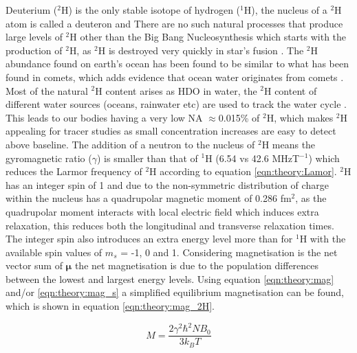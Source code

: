 Deuterium ($^2$H) is the only stable isotope of hydrogen ($^1$H), the nucleus of a $^2$H atom is called a deuteron and There are no such natural processes that produce large levels of $^2$H other than the Big Bang Nucleosynthesis which starts with the production of $^2$H, as $^2$H is destroyed very quickly in star's fusion \cite{Patrignani2016ReviewPhysics}. The $^2$H abundance found on earth's ocean has been found to be similar to what has been found in comets, which adds evidence that ocean water originates from comets \cite{Hersant2001APlanets}. Most of the natural $^2$H content arises as \ac{HDO} in water, the $^2$H content of different water sources (oceans, rainwater etc) are used to track the water cycle \cite{Bowen2019IsotopesApplications}. This leads to our bodies having a very low \ac{NA} $\approx$0.015\% of $^2$H, which makes $^2$H appealing for tracer studies as small concentration increases are easy to detect above baseline. The addition of a neutron to the nucleus of $^2$H means the gyromagnetic ratio ($\gamma$) is smaller than that of $^1$H (6.54 vs 42.6 MHzT$^{-1}$) which reduces the Larmor frequency of $^2$H according to equation \ref{eqn:theory:Lamor}. $^2$H has an integer spin of 1 and due to the non-symmetric distribution of charge within the nucleus has a quadrupolar magnetic moment of 0.286 fm$^2$, as the quadrupolar moment interacts with local electric field which induces extra relaxation, this reduces both the longitudinal and transverse relaxation times. The integer spin also introduces an extra energy level more than for $^1$H with the available spin values of $m_s$ = -1, 0 and 1. Considering magnetisation is the net vector sum of $\mathbf{\mu}$ the net magnetisation is due to the population differences between the lowest and largest energy levels. Using equation \ref{eqn:theory:mag} and/or \ref{eqn:theory:mag_s} a simplified equilibrium magnetisation can be found, which is shown in equation \ref{eqn:theory:mag_2H}.

\begin{equation}
    M = \frac{2\gamma^2 \hbar^2 N B_0}{3k_BT}
    \label{eqn:theory:mag_2H}
\end{equation}


